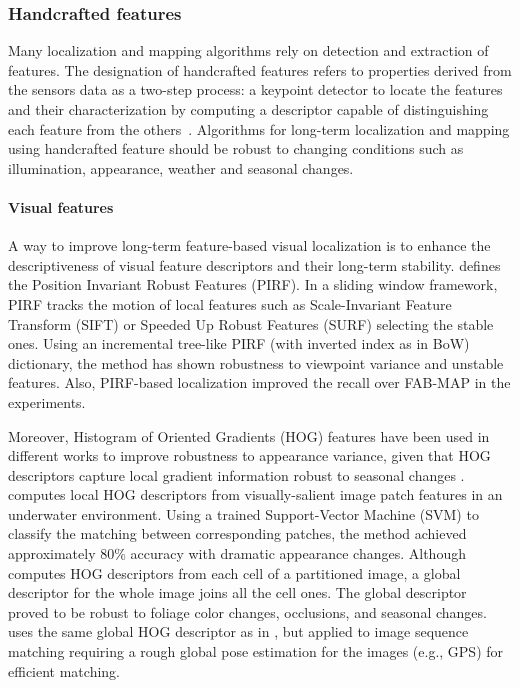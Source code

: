 \subsubsection{Handcrafted features}
\label{sec:discussion:appearance:handcrafted}

Many localization and mapping algorithms rely on detection and extraction of features. The designation of handcrafted features refers to properties derived from the sensors data as a two-step process: a keypoint detector to locate the features and their characterization by computing a descriptor capable of distinguishing each feature from the others~\parencite{discussion:handcrafted-features}.
Algorithms for long-term localization and mapping using handcrafted feature should be robust to changing conditions such as illumination, appearance, weather and seasonal changes.

\paragraph{Visual features}

A way to improve long-term feature-based visual localization is to enhance the descriptiveness of visual feature descriptors and their long-term stability.
\cite{kawewong-et-al:2013:826410} defines the Position Invariant Robust Features (PIRF). In a sliding window framework, PIRF tracks the motion of local features such as Scale-Invariant Feature Transform (SIFT) or Speeded Up Robust Features (SURF) selecting the stable ones.
Using an incremental tree-like PIRF (with inverted index as in BoW) dictionary, the method has shown robustness to viewpoint variance and unstable features. Also, PIRF-based localization improved the recall over FAB-MAP in the experiments.

Moreover, Histogram of Oriented Gradients (HOG) features have been used in different works to improve robustness to appearance variance, given that HOG descriptors capture local gradient information robust to seasonal changes \parencite{naseer-et-al:2015:7324181}.
\cite{li-et-al:2015:7139706} computes local HOG descriptors from visually-salient image patch features in an underwater environment. Using a trained Support-Vector Machine (SVM) to classify the matching between corresponding patches, the method achieved approximately 80\% accuracy with dramatic appearance changes.
Although \cite{naseer-et-al:2015:7324181} computes HOG descriptors from each cell of a partitioned image, a global descriptor for the whole image joins all the cell ones. The global descriptor proved to be robust to foliage color changes, occlusions, and seasonal changes.
\cite{vysotska-et-al:2015:7139576} uses the same global HOG descriptor as in \cite{naseer-et-al:2015:7324181}, but applied to image sequence matching requiring a rough global pose estimation for the images (e.g., GPS) for efficient matching.


